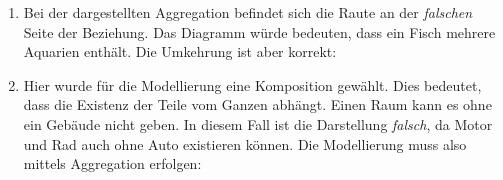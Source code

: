 \documentclass{bschlangaul-aufgabe}
\begin{document}
\begin{enumerate}
\item \strut


\begin{liAntwort}
Bei der dargestellten Aggregation befindet sich die Raute an der
\emph{falschen} Seite der Beziehung. Das Diagramm würde bedeuten, dass
ein Fisch mehrere Aquarien enthält. Die Umkehrung ist aber korrekt:

\end{liAntwort}

\item \strut


\begin{liAntwort}
Hier wurde für die Modellierung eine Komposition gewählt. Dies bedeutet,
dass die Existenz der Teile vom Ganzen abhängt. Einen Raum kann es \zB
ohne ein Gebäude nicht geben. In diesem Fall ist die Darstellung
\emph{falsch}, da Motor und Rad auch ohne Auto existieren können. Die
Modellierung muss also mittels Aggregation erfolgen:

\end{liAntwort}

\end{enumerate}
\end{document}
